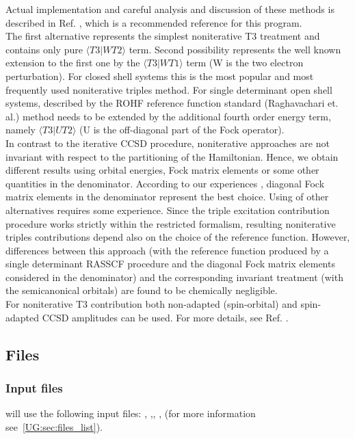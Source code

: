 Actual implementation and careful analysis and discussion of these
methods is described in Ref. \cite{t3_neo}, which is a recommended reference
for this program.\\
The first alternative represents the simplest noniterative T3 treatment and contains
only pure ${\langle T3 | W T2\rangle}$ term. Second possibility represents the well known
extension to the first one by the ${\langle T3 | W T1 \rangle}$ term
(W is the two electron perturbation). For closed shell
systems this is the most popular and most frequently used noniterative triples
method. For single determinant open shell systems, described by the
ROHF reference
function standard (Raghavachari et. al.) method needs to be extended by the
additional fourth order energy term, namely
 ${\langle T3 | U T2 \rangle}$ (U is the off-diagonal part of the Fock operator).\\
In contrast to the iterative CCSD procedure, noniterative approaches are not
invariant with respect to the partitioning of the Hamiltonian.
Hence, we obtain
different results using orbital energies, Fock matrix elements
or some other quantities in the
denominator. According to our experiences \cite{t3_neo},
diagonal Fock matrix elements in the
denominator represent the best choice. Using of other alternatives
requires some experience.
 Since the triple excitation contribution procedure works strictly within the restricted formalism, resulting
noniterative triples contributions depend also on the choice of the reference
function. However, differences between this approach (with the reference
function produced by a single determinant RASSCF procedure and the diagonal
 Fock matrix elements considered in the denominator) and the corresponding
invariant treatment (with the semicanonical orbitals)
 are found to be chemically negligible.\\
For noniterative T3 contribution both non-adapted (spin-orbital) and spin-adapted
CCSD amplitudes can be used. For more details, see Ref. \cite{t3_neo}.

\subsection{Files}
\label{sec:ccsdt_files}

\subsubsection{Input files}
 will use the following input
files: , ,, ,
(for more information see~\ref{UG:sec:files_list}).

